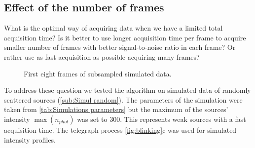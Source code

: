 
\subsection{Effect of the number of frames\label{sub:results - number of frames}}
%

What is the optimal way of acquiring data when we have a limited total acquisition time? Is it better to use longer acquisition time per frame to acquire smaller number of frames with better signal-to-noise ratio in each frame? Or rather use as fast acquisition as possible acquiring many frames? 

\begin{figure}[!htb]	
	\newcommand{\widthfig}{1\textwidth}
	\centering	
	
	
	
	\caption{First eight frames of subsampled simulated data. }
	\label{fig:subsampled data}
\end{figure} 

To address these question we tested the algorithm on simulated data of randomly scattered sources (\autoref{sub:Simul random}). The parameters of the simulation were taken from \autoref{tab:Simulations parameters} but the maximum of the sources' intensity $\max(n_{phot})$ was set to 300. This represents weak sources with a fast acquisition time. The telegraph process \autoref{fig:blinking}c was used for simulated intensity profiles. 

